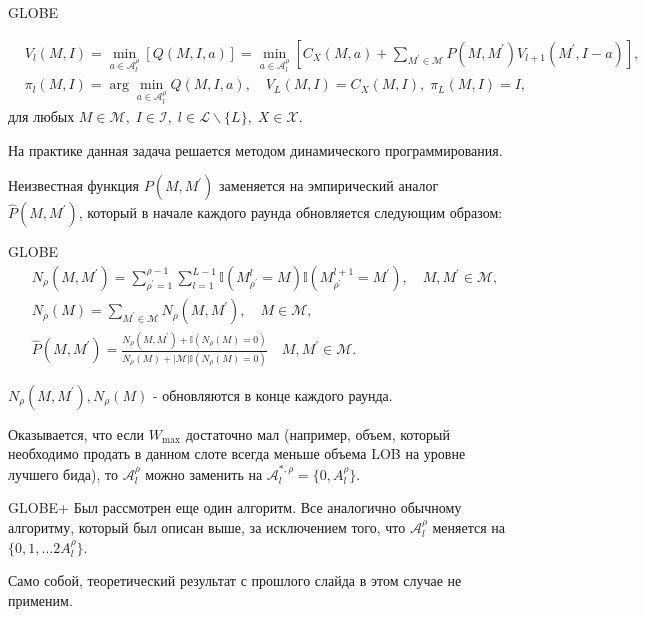 \documentclass[aspectratio=169]{beamer}
\begin{document}
    
    \begin{frame}{GLOBE}

        \begin{align*}
            &V_l(M, I) =\min\limits_{a \in \mathcal A_l^\rho}\left[ Q(M, I, a) \right] =\min\limits_{a \in \mathcal A_l^\rho} \left[C_X(M, a) + \sum\limits_{M^\prime \in \mathcal M} P(M, M^\prime) V_{l+1}(M^\prime, I - a ) \right], \\
            &\pi_l(M,I) = \arg\min\limits_{a \in \mathcal A_l^\rho}Q(M, I, a), \quad V_L(M,I) = C_X(M,I), \; \pi_L(M,I) = I,
        \end{align*}
        для любых $M \in \mathcal M, \; I \in \mathcal I, \; l \in \mathcal L \backslash \{L\}, \; X \in \mathcal X $.

        На практике данная задача решается методом динамического программирования. 

        Неизвестная функция $P(M, M^\prime)$ заменяется на эмпирический аналог $\hat P(M, M^\prime)$, который в начале каждого раунда обновляется следующим образом:

    \end{frame}

    \begin{frame}{GLOBE}
        \begin{align*}
            &N_\rho(M, M^\prime) = \sum\limits_{\rho^\prime = 1}^{\rho - 1} \sum\limits_{l = 1}^{L - 1} \mathbb I (M_{\rho^\prime}^l = M)\mathbb I (M_{\rho^\prime}^{l + 1} = M^\prime), \quad M, M^\prime \in \mathcal M, \\
            &N_\rho(M) = \sum\limits_{M^\prime \in \mathcal M} N_\rho(M, M^\prime), \quad M \in \mathcal M,\\
            &\hat P(M, M^\prime) = \frac{N_\rho(M, M^\prime) + \mathbb I (N_\rho(M) = 0 ) } {N_\rho (M) + |\mathcal M| \mathbb I (N_\rho(M) = 0 )} \quad M, M^\prime \in \mathcal M.
        \end{align*}

        $N_\rho(M, M^\prime), N_\rho(M)$ - обновляются в конце каждого раунда.

        Оказывается, что если $W_{\max}$ достаточно мал (например, объем, который необходимо продать в данном слоте всегда меньше объема LOB на уровне лучшего бида), то $\mathcal A_l^\rho$ можно заменить на $\mathcal A_l^{*,\rho} = \{0, A_l^\rho \}$.
        
    \end{frame}

    \begin{frame}{GLOBE+}
        Был рассмотрен еще один алгоритм. Все аналогично обычному алгоритму, который был описан выше, за исключением того, что $\mathcal A_l^\rho$ меняется на $\{0,1,\ldots 2A_l^\rho\}$.

        Само собой, теоретический результат с прошлого слайда в этом случае не применим.

    \end{frame}
\end{document}
